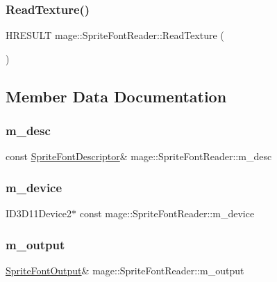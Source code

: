 \subsubsection{\texorpdfstring{Read\+Texture()}{ReadTexture()}}
{\footnotesize\ttfamily H\+R\+E\+S\+U\+LT mage\+::\+Sprite\+Font\+Reader\+::\+Read\+Texture (\begin{DoxyParamCaption}{ }\end{DoxyParamCaption})\hspace{0.3cm}{\ttfamily [private]}}



\subsection{Member Data Documentation}
\hypertarget{classmage_1_1_sprite_font_reader_a6951665c0a5fda28ea6784945565cb6e}{}\label{classmage_1_1_sprite_font_reader_a6951665c0a5fda28ea6784945565cb6e} 
\subsubsection{\texorpdfstring{m\+\_\+desc}{m\_desc}}
{\footnotesize\ttfamily const \hyperlink{structmage_1_1_sprite_font_descriptor}{Sprite\+Font\+Descriptor}\& mage\+::\+Sprite\+Font\+Reader\+::m\+\_\+desc\hspace{0.3cm}{\ttfamily [private]}}

\hypertarget{classmage_1_1_sprite_font_reader_aa77ee2a35b9ad15d5c1abfc6ffe5810c}{}\label{classmage_1_1_sprite_font_reader_aa77ee2a35b9ad15d5c1abfc6ffe5810c} 
\subsubsection{\texorpdfstring{m\+\_\+device}{m\_device}}
{\footnotesize\ttfamily I\+D3\+D11\+Device2$\ast$ const mage\+::\+Sprite\+Font\+Reader\+::m\+\_\+device\hspace{0.3cm}{\ttfamily [private]}}

\hypertarget{classmage_1_1_sprite_font_reader_a3df62ce71f85745c493b142c726261b3}{}\label{classmage_1_1_sprite_font_reader_a3df62ce71f85745c493b142c726261b3} 
\subsubsection{\texorpdfstring{m\+\_\+output}{m\_output}}
{\footnotesize\ttfamily \hyperlink{structmage_1_1_sprite_font_output}{Sprite\+Font\+Output}\& mage\+::\+Sprite\+Font\+Reader\+::m\+\_\+output\hspace{0.3cm}{\ttfamily [private]}}

